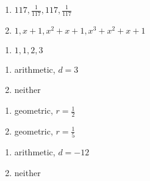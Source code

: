 \begin{multicols}{2}
\begin{enumerate}
\setcounter{enumi}{\value{HW}}

\item $117, \frac{1}{117}, 117, \frac{1}{117}$
\item $1, x + 1, x^{2} + x + 1, x^{3} + x^{2} + x + 1 $

\setcounter{HW}{\value{enumi}}
\end{enumerate}
\end{multicols}

\begin{multicols}{2}
\begin{enumerate}
\setcounter{enumi}{\value{HW}}

\item $1, 1, 2, 3$

\setcounter{HW}{\value{enumi}}
\end{enumerate}
\end{multicols}

\begin{multicols}{2}
\begin{enumerate}
\setcounter{enumi}{\value{HW}}

\item  arithmetic, $d = 3$

\item  neither


\setcounter{HW}{\value{enumi}}
\end{enumerate}
\end{multicols}

\begin{multicols}{2}
\begin{enumerate}
\setcounter{enumi}{\value{HW}}

\item  geometric, $r = \frac{1}{2}$

\item  geometric, $r = \frac{1}{5}$

\setcounter{HW}{\value{enumi}}
\end{enumerate}
\end{multicols}

\begin{multicols}{2}
\begin{enumerate}
\setcounter{enumi}{\value{HW}}


\item  arithmetic, $d = -12$

\item  neither

\setcounter{HW}{\value{enumi}}
\end{enumerate}
\end{multicols}

